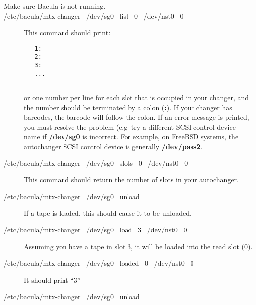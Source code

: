 \begin{description}

\item [Make sure Bacula is not running.]

\item [/etc/bacula/mtx-changer \ /dev/sg0 \ list \ 0 \ /dev/nst0 \ 0]
This command should print:  

\footnotesize
\begin{verbatim}
   1:
   2:
   3:
   ...
   
\end{verbatim}
\normalsize

or one number per line for each slot that is  occupied in your changer, and
the number should be  terminated by a colon ({\bf :}). If your changer has 
barcodes, the barcode will follow the colon.  If an error message is printed,
you must resolve the  problem (e.g. try a different SCSI control device name
if {\bf /dev/sg0}  is incorrect. For example, on FreeBSD systems, the
autochanger  SCSI control device is generally {\bf /dev/pass2}.  

\item [/etc/bacula/mtx-changer \ /dev/sg0 \ slots \ 0 \ /dev/nst0 \ 0]
This command should return the number of slots in your autochanger.  

\item [/etc/bacula/mtx-changer \ /dev/sg0 \ unload \ ]
   If a tape is loaded, this should cause  it to be unloaded.  

\item [/etc/bacula/mtx-changer \ /dev/sg0 \ load \ 3 \ /dev/nst0 \ 0 ]
Assuming you have a tape in slot 3,  it will be loaded into the read slot (0).
 

\item [/etc/bacula/mtx-changer \ /dev/sg0 \ loaded \ 0 \ /dev/nst0 \ 0]
It should print ``3''  

\item [/etc/bacula/mtx-changer \ /dev/sg0 \ unload]
   \end{description}

